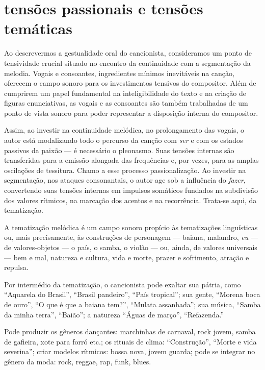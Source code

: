 \section{tensões passionais e tensões temáticas}

Ao descrevermos a gestualidade oral do cancionista, consideramos um
ponto de tensividade crucial situado no encontro da continuidade com a
segmentação da melodia. Vogais e consoantes, ingredientes mínimos
inevitáveis na canção, oferecem o campo sonoro para os investimentos
tensivos do compositor. Além de cumprirem um papel fundamental na
inteligibilidade do texto e na criação de figuras enunciativas, as
vogais e as consoantes são também trabalhadas de um ponto de vista
sonoro para poder representar a disposição interna do compositor.

Assim, ao investir na continuidade melódica, no prolongamento das
vogais, o autor está modalizando todo o percurso da canção com \textit{ser} e
com os estados passivos da paixão --- é necessário o pleonasmo. Suas
tensões internas são transferidas para a emissão alongada das
frequências e, por vezes, para as amplas oscilações de tessitura. Chamo
a esse processo passionalização. Ao investir na segmentação, nos ataques
consonantais, o autor age sob a influência do \textit{fazer}, convertendo suas
tensões internas em impulsos somáticos fundados na subdivisão dos
valores rítmicos, na marcação dos acentos e na recorrência. Trata-se
aqui, da tematização.

A tematização melódica é um campo sonoro propício às tematizações
linguísticas ou, mais precisamente, às construções de personagem --- baiana, malandro, \textit{eu} --- de valores-objetos --- o país, o samba, o violão --- ou, ainda, de valores universais --- bem e mal, natureza e cultura, vida e morte, prazer e sofrimento, atração e repulsa. 

Por intermédio da tematização, o cancionista pode exaltar sua pátria, como ``Aquarela do Brasil'', ``Brasil
pandeiro'', ``País tropical''; sua gente, ``Morena boca de ouro'', ``O que é que a
baiana tem?'', ``Mulata assanhada''; sua música, ``Samba da minha terra'',
``Baião''; a natureza ``Águas de março'', ``Refazenda.'' 

Pode produzir os gêneros dançantes: marchinhas de carnaval, rock jovem, samba de gafieira, xote
para forró etc.; os rituais de clima: ``Construção'', ``Morte e vida
severina''; criar modelos rítmicos: bossa nova, jovem guarda; pode
se integrar no gênero da moda: rock, reggae, rap, funk, blues. 

